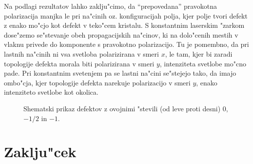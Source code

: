 \documentclass[a4paper,10pt]{article}
\begin{document}
Na podlagi rezultatov lahko zaklju"cimo, da ``prepovedana'' pravokotna polarizacija manjka le pri na"cinih oz. konfiguracijah polja, kjer polje tvori defekt z enako mo"cjo kot defekt v teko"cem kristalu. 
S konstantnim laserskim "zarkom dose"zemo se"stevanje obeh propagacijskih na"cinov, ki na dolo"cenih mestih v vlaknu privede do komponente s pravokotno polarizacijo. 
Tu je pomembno, da pri lastnih na"cinih ni vsa svetloba polarizirana v smeri $x$, le tam, kjer bi zaradi topologije defekta morala biti polarizirana v smeri $y$, intenziteta svetlobe mo"cno pade. 
Pri konstantnim svetenjem pa se lastni na"cini se"stejejo tako, da imajo ombo"cja, kjer topologije defekta narekuje polarizacijo v smeri $y$, enako intenziteto svetlobe kot okolica. 

\begin{figure}[h]
 \caption{Shematski prikaz defektov z ovojnimi "stevili (od leve proti desni) $0$, $-1/2$ in $-1$. }
\end{figure}

\section{Zaklju"cek}

\newpage


\end{document}
